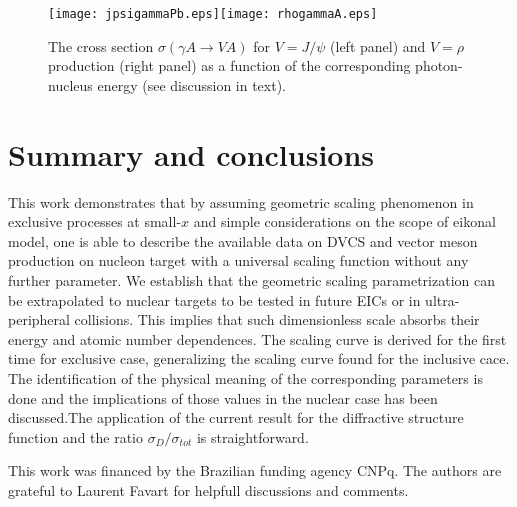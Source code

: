 \documentclass[twocolumn,showpacs,preprintnumbers,amsmath,amssymb,showkeys,aps,prd,a4paper,byrevtex]{revtex4}
\begin{document}
\begin{figure*}[t]
\texttt{[image: jpsigammaPb.eps]}\texttt{[image: rhogammaA.eps]}
\caption{The cross section $\sigma (\gamma A\rightarrow V A)$ for $V = J/\psi$  (left panel) and $V=\rho$  production (right panel) as a function of the corresponding photon-nucleus energy (see discussion in text).} 
\label{fig:3}
\end{figure*}



\section{Summary and conclusions \label{sec:sumcon}} 

This work demonstrates that by assuming geometric scaling phenomenon in exclusive processes at small-$x$ and simple considerations on the scope of  eikonal model, one is able to describe the available data on DVCS and vector meson production on nucleon target with a universal scaling function without any further parameter. We establish that the geometric scaling parametrization can be extrapolated to nuclear targets to be tested in future EICs or in ultra-peripheral collisions.  This implies that such dimensionless scale absorbs their energy and atomic number dependences. The scaling curve is derived for the first time for exclusive case, generalizing the scaling curve found for the inclusive cace. The identification of the physical meaning of the corresponding parameters is done and the implications of those values in the nuclear case has been discussed.The application of the current result for the diffractive structure function and the ratio $\sigma_D/\sigma_{tot}$ is straightforward. 

\begin{acknowledgments}


This work was financed by the Brazilian funding agency CNPq. The authors are grateful to Laurent Favart for helpfull discussions and comments.

\end{acknowledgments}
\end{document}

